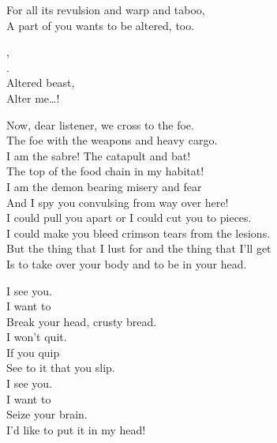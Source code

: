 
For all its revulsion and warp and taboo, \\
A part of you wants to be altered, too. \\


, \\
. \\
Altered beast, \\
Alter me…! \\





Now, dear listener, we cross to the foe. \\
The foe with the weapons and heavy cargo. \\

I am the sabre! The catapult and bat! \\
The top of the food chain in my habitat! \\

I am the demon bearing misery and fear \\
And I spy you convulsing from way over here! \\

I could pull you apart or I could cut you to pieces. \\
I could make you bleed crimson tears from the lesions. \\

But the thing that I lust for and the thing that I'll get \\
Is to take over your body and to be in your head. \\


I see you. \\
I want to \\
Break your head, crusty bread. \\

I won't quit. \\
If you quip \\
See to it that you slip. \\

I see you. \\
I want to \\
Seize your brain. \\
I'd like to put it in my head! \\

